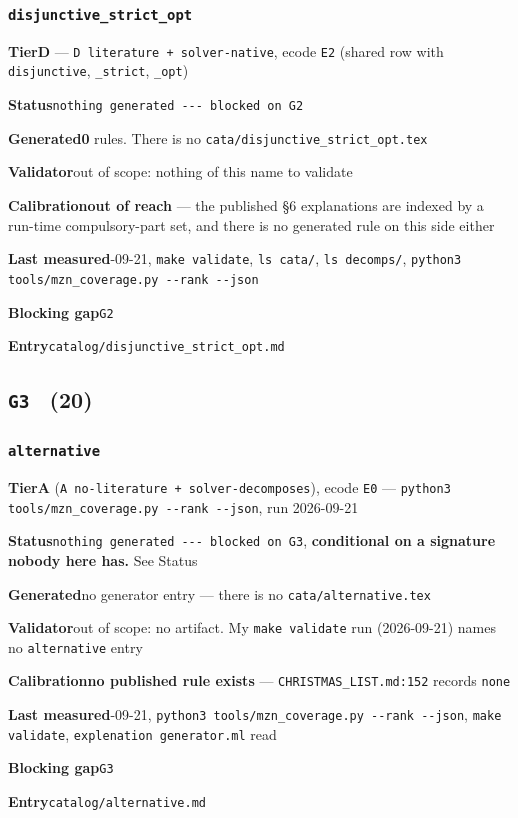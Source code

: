 \documentclass[10pt,a4paper]{article}
\newcommand{\entryfield}[2]{{\raggedright\textbf{#1}\quad #2\par}}
\begin{document}
\subsubsection*{\texttt{disjunctive\_\allowbreak{}strict\_\allowbreak{}opt}}
\label{entry:disjunctive-strict-opt}
\entryfield{Tier}{\textbf{D} --- \texttt{D literature + solver-\allowbreak{}native}, ecode \texttt{E2} (shared row with \texttt{disjunctive}, \texttt{\_strict}, \texttt{\_opt})}
\entryfield{Status}{\texttt{nothing generated -\allowbreak{}-\allowbreak{}-\allowbreak{} blocked on G2}}
\entryfield{Generated}{\textbf{0} rules. There is no \texttt{cata/\allowbreak{}disjunctive\_\allowbreak{}strict\_\allowbreak{}opt.\allowbreak{}tex}}
\entryfield{Validator}{out of scope: nothing of this name to validate}
\entryfield{Calibration}{\textbf{out of reach} --- the published \S{}6 explanations are indexed by a run-time compulsory-part set, and there is no generated rule on this side either}
\entryfield{Last measured}{2026-09-21, \texttt{make validate}, \texttt{ls cata/}, \texttt{ls decomps/}, \texttt{python3 tools/\allowbreak{}mzn\_\allowbreak{}coverage.\allowbreak{}py -\allowbreak{}-\allowbreak{}rank -\allowbreak{}-\allowbreak{}json}}
\entryfield{Blocking gap}{\texttt{G2}}
\entryfield{Entry}{\texttt{catalog/disjunctive\_strict\_opt.md}}
\subsection*{\texttt{G3} \ \normalsize(20)}
\subsubsection*{\texttt{alternative}}
\label{entry:alternative}
\entryfield{Tier}{\textbf{A} (\texttt{A no-\allowbreak{}literature + solver-\allowbreak{}decomposes}), ecode \texttt{E0} --- \texttt{python3 tools/\allowbreak{}mzn\_\allowbreak{}coverage.\allowbreak{}py -\allowbreak{}-\allowbreak{}rank -\allowbreak{}-\allowbreak{}json}, run 2026-09-21}
\entryfield{Status}{\texttt{nothing generated -\allowbreak{}-\allowbreak{}-\allowbreak{} blocked on G3}, \textbf{conditional on a signature nobody here has.} See Status}
\entryfield{Generated}{no generator entry --- there is no \texttt{cata/alternative.tex}}
\entryfield{Validator}{out of scope: no artifact. My \texttt{make validate} run (2026-09-21) names no \texttt{alternative} entry}
\entryfield{Calibration}{\textbf{no published rule exists} --- \texttt{CHRISTMAS\_LIST.md:152} records \texttt{none}}
\entryfield{Last measured}{2026-09-21, \texttt{python3 tools/\allowbreak{}mzn\_\allowbreak{}coverage.\allowbreak{}py -\allowbreak{}-\allowbreak{}rank -\allowbreak{}-\allowbreak{}json}, \texttt{make validate}, \texttt{explenation generator.ml} read}
\entryfield{Blocking gap}{\texttt{G3}}
\entryfield{Entry}{\texttt{catalog/alternative.md}}
\end{document}
